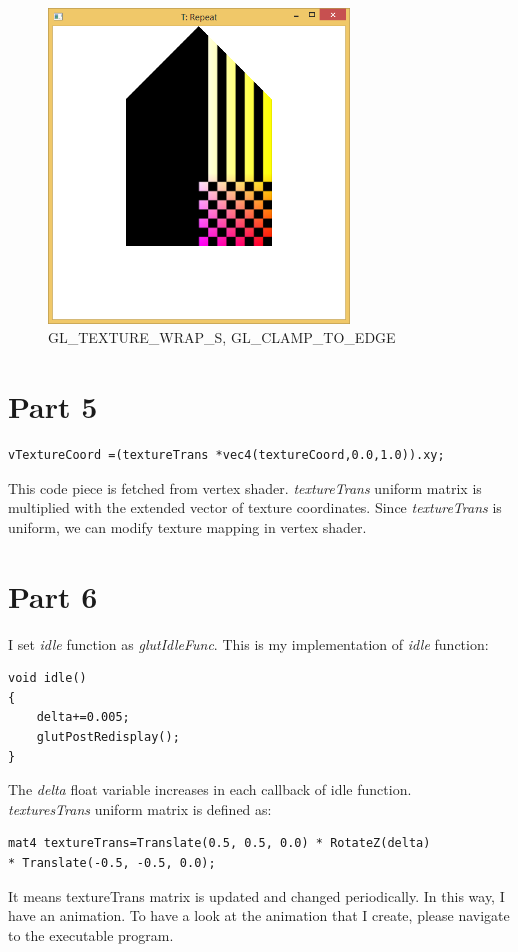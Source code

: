 \begin{figure}[hp]
\centering
\includegraphics[width=8cm]{../Screenshots/ex-6/4-7.png}
\caption{GL\_TEXTURE\_WRAP\_S, GL\_CLAMP\_TO\_EDGE}
\label{fig:6-4-7}
\end{figure}


\section{Part 5}
\label{sec:del-5-1}

\begin{lstlisting}
vTextureCoord =(textureTrans *vec4(textureCoord,0.0,1.0)).xy;
\end{lstlisting}

This code piece is fetched from vertex shader. \emph{textureTrans} uniform matrix is multiplied with the extended vector of texture coordinates. Since \emph{textureTrans} is uniform, we can modify texture mapping in vertex shader.

\section{Part 6}
\label{sec:del-6-1}

I set \emph{idle} function as \emph{glutIdleFunc}. This is my implementation of \emph{idle} function: \\

\begin{lstlisting}
void idle()
{
	delta+=0.005;
	glutPostRedisplay();
}
\end{lstlisting}
The \emph{delta} float variable increases in each callback of idle function. \\
\emph{texturesTrans} uniform matrix is defined as: \\

\begin{lstlisting}
mat4 textureTrans=Translate(0.5, 0.5, 0.0) * RotateZ(delta) 
* Translate(-0.5, -0.5, 0.0);
\end{lstlisting}

It means textureTrans matrix is updated and changed periodically. In this way, I have an animation. To have a look at the animation that I create, please navigate to the executable program.

